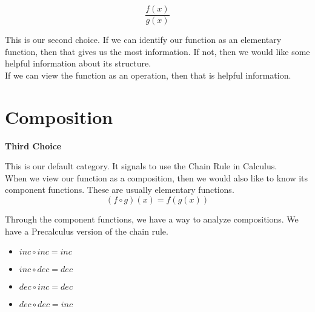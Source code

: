 \documentclass{ximera}
\begin{document}
\[
\frac{f(x)}{g(x)}
\]





This is our second choice.  If we can identify our function as an elementary function, then that gives us the most information. If not, then we would like some helpful information about its structure. \\



If we can view the function as an operation, then that is helpful information.\\







































\section*{Composition}


\textbf{\textcolor{purple!85!blue}{Third Choice}} 

This is our default category.  It signals to use the Chain Rule in Calculus. \\


When we view our function as a composition, then we would also like to know its component functions. These are usually elementary functions. \\



\[
(f \circ g)(x) = f(g(x))
\]



Through the component functions, we have a way to analyze compositions.  We have a Precalculus version of the chain rule.


\begin{itemize}
\item  $inc \circ inc = inc$
\item  $inc \circ dec = dec$
\item  $dec \circ inc = dec$
\item  $dec \circ dec = inc$
\end{itemize}
\end{document}
